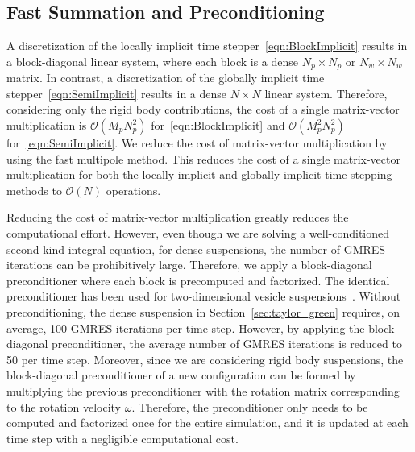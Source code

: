 \documentclass[AMA,STIX1COL]{WileyNJD-v2}
\begin{document}
\subsection{Fast Summation and Preconditioning}
\label{sec:fast}
A discretization of the locally implicit time
stepper~\eqref{eqn:BlockImplicit} results in a block-diagonal linear
system, where each block is a dense $N_p \times N_p$ or $N_w \times N_w$
matrix.  In contrast, a discretization of the globally implicit time
stepper~\eqref{eqn:SemiImplicit} results in a dense $N \times N$ linear
system.  Therefore, considering only the rigid body contributions, the
cost of a single matrix-vector multiplication is $\mathcal{O}(M_p
N_p^2)$ for~\eqref{eqn:BlockImplicit} and $\mathcal{O}(M_p^2 N_p^2)$
for~\eqref{eqn:SemiImplicit}.  We reduce the cost of matrix-vector
multiplication by using the fast multipole method.  This reduces the
cost of a single matrix-vector multiplication for both the locally
implicit and globally implicit time stepping methods to $\mathcal{O}(N)$
operations.

Reducing the cost of matrix-vector multiplication greatly reduces the
computational effort.  However, even though we are solving a
well-conditioned second-kind integral equation, for dense suspensions,
the number of GMRES iterations can be prohibitively large.  Therefore,
we apply a block-diagonal preconditioner where each block is precomputed
and factorized.  The identical preconditioner has been used for
two-dimensional vesicle suspensions~\cite{Quaife2014}.  Without
preconditioning, the dense suspension in Section~\ref{sec:taylor_green}
requires, on average, 100 GMRES iterations per time step. However, by
applying the block-diagonal preconditioner, the average number of GMRES
iterations is reduced to 50 per time step.  Moreover, since we are
considering rigid body suspensions, the block-diagonal preconditioner of
a new configuration can be formed by multiplying the previous
preconditioner with the rotation matrix corresponding to the rotation
velocity $\omega$.  Therefore, the preconditioner only needs to be
computed and factorized once for the entire simulation, and it is
updated at each time step with a negligible computational cost.


\end{document}
